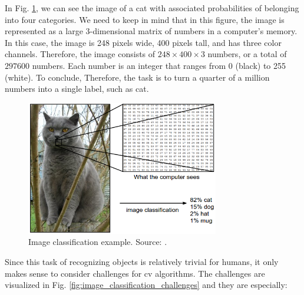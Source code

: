         In Fig. \ref{fig:image_classification}, we can see the image of a cat with associated probabilities of belonging into four categories. We need to keep in mind that in this figure, the image is represented as a large 3-dimensional matrix of numbers in a computer's memory. In this case, the image is 248 pixels wide, 400 pixels tall, and has three color channels. Therefore, the image consists of $248 \times 400 \times 3$ numbers, or a total of $297 600$ numbers. Each number is an integer that ranges from 0 (black) to 255 (white). To conclude, Therefore, the task is to turn a quarter of a million numbers into a single label, such as cat. \cite{cs231n}
        
        \begin{figure}[ht]
            \centering
            \includegraphics[width=0.75\textwidth]{resources/image_classification.png}
            \caption{Image classification example. Source: \cite{cs231n}.}
            \label{fig:image_classification}
        \end{figure}
    
        Since this task of recognizing objects is relatively trivial for humans, it only makes sense to consider challenges for \gls{cv} algorithms. The challenges are visualized in Fig. \ref{fig:image_classification_challenges} and they are especially:
    
